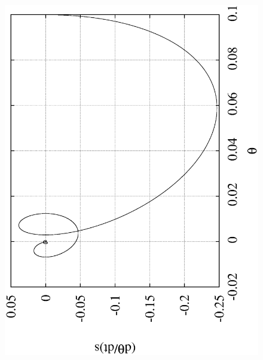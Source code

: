 \documentclass[10pt,a4paper]{article}
\begin{document}
\begin{figure}[h!]
\begin{center}
\includegraphics[scale = 0.3, angle =-90]{frac1.eps}

\end{center}
\end{figure}
\end{document}

